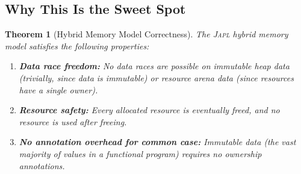 \documentclass[11pt,twocolumn]{article}
\newtheorem{theorem}{Theorem}[section]
\newcommand{\japl}{\textsc{Japl}}
\begin{document}
\subsection{Why This Is the Sweet Spot}

\begin{theorem}[Hybrid Memory Model Correctness]
\label{thm:hybrid-correct}
The \japl{} hybrid memory model satisfies the following properties:
\begin{enumerate}
\item \textbf{Data race freedom:} No data races are possible on immutable heap data (trivially, since data is immutable) or resource arena data (since resources have a single owner).
\item \textbf{Resource safety:} Every allocated resource is eventually freed, and no resource is used after freeing.
\item \textbf{No annotation overhead for common case:} Immutable data (the vast majority of values in a functional program) requires no ownership annotations.
\end{enumerate}
\end{theorem}
\end{document}
